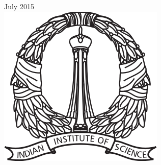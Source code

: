 \documentclass[12pt, titlepage]{article}
\theoremstyle{definition}
\begin{document}
\begin{titlepage}

{\large July 2015}\\[2cm] %


\includegraphics[scale=0.7]{images/logo.png}\\[1cm] %
 

\vfill %

\end{titlepage}


\vspace*{3.5cm}
\end{document}
